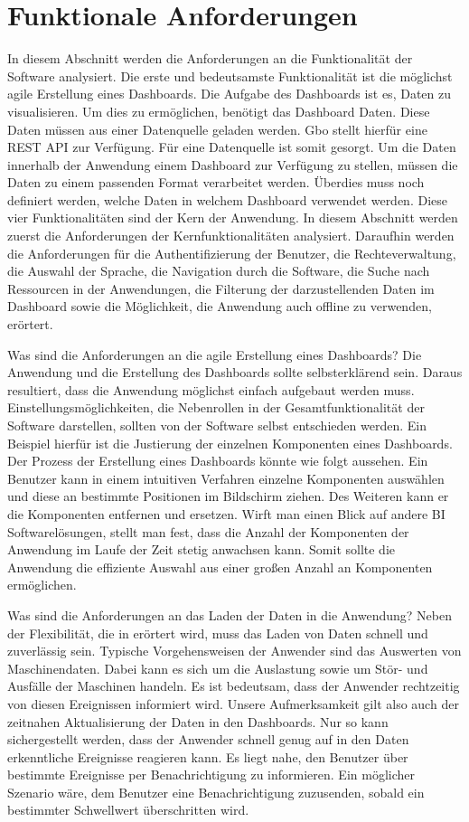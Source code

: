 \section{Funktionale Anforderungen}
\label{sec:funktionaleanforderungen}
In diesem Abschnitt werden die Anforderungen an die Funktionalität der Software analysiert.
Die erste und bedeutsamste Funktionalität ist
die möglichst agile Erstellung eines Dashboards. Die Aufgabe des Dashboards ist es, Daten
zu visualisieren. Um dies zu ermöglichen, benötigt das Dashboard Daten. Diese Daten
müssen aus einer Datenquelle geladen werden. Gbo stellt hierfür eine REST API
zur Verfügung. Für eine Datenquelle ist somit gesorgt. Um die Daten innerhalb der Anwendung
einem Dashboard zur Verfügung zu stellen, müssen die Daten zu einem passenden Format verarbeitet werden.
Überdies muss noch definiert werden, welche Daten in welchem Dashboard verwendet
werden. Diese vier Funktionalitäten sind der Kern der Anwendung. In diesem Abschnitt
werden zuerst die Anforderungen der Kernfunktionalitäten analysiert. Daraufhin werden die Anforderungen
für die Authentifizierung der Benutzer, die Rechteverwaltung, die Auswahl der Sprache,
die Navigation durch die Software, die Suche nach Ressourcen in der Anwendungen,
die Filterung der darzustellenden Daten im Dashboard sowie die Möglichkeit,
die Anwendung auch offline zu verwenden, erörtert.

Was sind die Anforderungen an die agile Erstellung eines Dashboards? Die Anwendung und
die Erstellung des Dashboards sollte selbsterklärend sein. Daraus resultiert, 
dass die Anwendung möglichst einfach aufgebaut werden muss. Einstellungsmöglichkeiten,
die Nebenrollen in der Gesamtfunktionalität der Software darstellen, sollten von der
Software selbst entschieden werden. Ein Beispiel hierfür ist die Justierung der
einzelnen Komponenten eines Dashboards. Der Prozess der Erstellung eines Dashboards
könnte wie folgt aussehen. Ein Benutzer kann in einem intuitiven Verfahren
einzelne Komponenten auswählen und diese an bestimmte Positionen im Bildschirm
ziehen. Des Weiteren kann er die Komponenten
entfernen und ersetzen. Wirft man einen Blick auf andere BI Softwarelösungen,
stellt man fest, dass die Anzahl der Komponenten der Anwendung im Laufe der Zeit
stetig anwachsen kann. Somit sollte die Anwendung die effiziente Auswahl aus einer großen
Anzahl an Komponenten ermöglichen.

Was sind die Anforderungen an das Laden der Daten in die Anwendung? Neben der Flexibilität,
die in  erörtert wird, muss das Laden von Daten schnell und zuverlässig
sein. Typische Vorgehensweisen der Anwender sind das Auswerten von Maschinendaten. Dabei kann es
sich um die Auslastung sowie um Stör- und Ausfälle der Maschinen handeln. Es ist bedeutsam,
dass der Anwender rechtzeitig von diesen Ereignissen informiert wird. Unsere
Aufmerksamkeit gilt also auch der zeitnahen Aktualisierung der Daten in den Dashboards. Nur
so kann sichergestellt werden, dass der Anwender schnell genug auf in den Daten erkenntliche
Ereignisse reagieren kann. Es liegt nahe, den Benutzer
über bestimmte Ereignisse per Benachrichtigung zu informieren. Ein möglicher Szenario wäre,
dem Benutzer eine Benachrichtigung zuzusenden, sobald ein bestimmter Schwellwert überschritten
wird.


